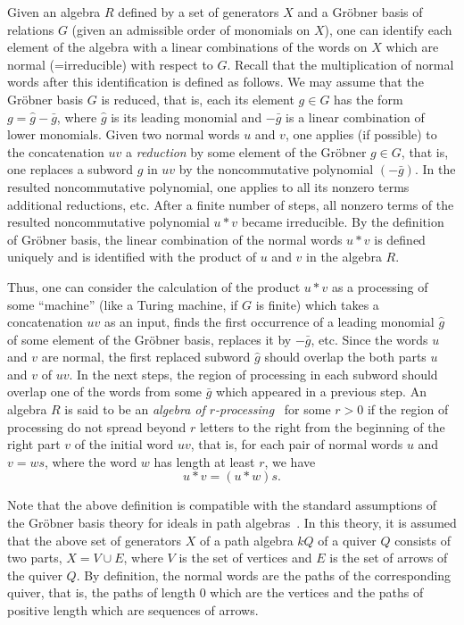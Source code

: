 \documentclass{amsart}
\numberwithin{equation}{section}
\theoremstyle{plain}
\theoremstyle{definition}
\begin{document}
 Given an algebra $R$ defined by a set of generators $X$ and a
Gr\"obner basis of relations $G$ (given an admissible order of monomials 
on $X$), one can identify each element of
the algebra with a linear combinations of the words on $X$ which are
normal (=irreducible) with respect to $G$.
Recall that the multiplication of normal words after this identification is defined as follows.
We may assume that the Gr\"obner basis $G$ is reduced, that is, each its element 
$g\in G$ has the form $g = \hat g - \bar g$, where $\hat g$ is its leading monomial and $-\bar g$
is a linear combination of lower monomials. 
Given two normal words $u$ and $v$, one applies (if possible) to the concatenation $uv$ a {\it reduction} 
by some element of the Gr\"obner 
$g\in G$, that is, one replaces a subword $\hat g$ in $uv$ by the noncommutative polynomial $(-\bar g)$. 
In the resulted noncommutative polynomial, one applies to all its nonzero terms additional reductions, etc.
After a finite number of steps, all nonzero terms of the 
 resulted noncommutative polynomial $u*v$ became irreducible.  By the definition of Gr\"obner basis,  
 the linear combination 
 of the normal words $u*v$ is defined uniquely and is 
 identified with the product of $u$ and $v$ in the algebra $R$. 
 
 Thus, one can consider the calculation of the product $u*v$ as a processing of some ``machine''
 (like a Turing machine, if $G$ is finite) which takes a concatenation $uv$ as an input,
 finds the first occurrence  of a leading monomial $\hat g$ of some element of the Gr\"obner basis, 
 replaces it by $-\bar g$, etc. Since the words $u$ and $v$ are normal, the first replaced subword $\hat g$
 should overlap the both parts $u$ and $v$ of $uv$. In the next steps, the region of processing in each subword should  overlap one of the words from some $\bar g$ which appeared in a previous step. 
 An algebra $R$ is said to be an {\em algebra of $r$-processing}~\cite{pi01} for some $r>0$ if the region of processing 
 do not spread beyond $r$ letters to the right from the beginning of the right part $v$ of the initial word $uv$, that is, for each pair of normal words $u$ and $v = ws$, where the word $w$ has length at least $r$,
 we have
 $$
     u*v = (u*w)s.
 $$

Note that the above definition is compatible with the standard assumptions of the Gr\"obner basis
theory for ideals in path algebras~\cite{ffg}. In this theory, it is assumed that the above
 set of generators $X$
of a path algebra $kQ$ of a quiver $Q$ consists of two parts, $X = V \cup E$, where $V$ is the set of vertices and $E$ is the set of arrows of the quiver $Q$. By definition, the normal words are the paths of the corresponding quiver, that is, the paths of length 0 which are  the vertices and the paths of positive length which are sequences of arrows.
\end{document}
